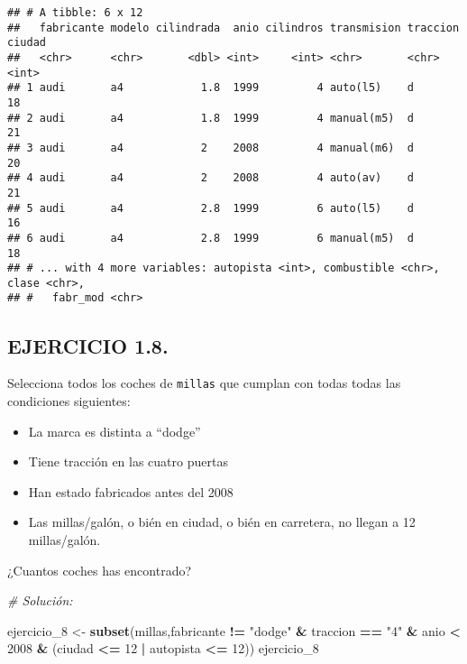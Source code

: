 \documentclass[]{article}
\newenvironment{Shaded}{\begin{snugshade}}{\end{snugshade}}
\newcommand{\CommentTok}[1]{\textcolor[rgb]{0.56,0.35,0.01}{\textit{#1}}}
\newcommand{\DecValTok}[1]{\textcolor[rgb]{0.00,0.00,0.81}{#1}}
\newcommand{\KeywordTok}[1]{\textcolor[rgb]{0.13,0.29,0.53}{\textbf{#1}}}
\newcommand{\NormalTok}[1]{#1}
\newcommand{\OperatorTok}[1]{\textcolor[rgb]{0.81,0.36,0.00}{\textbf{#1}}}
\newcommand{\StringTok}[1]{\textcolor[rgb]{0.31,0.60,0.02}{#1}}
\providecommand{\tightlist}{%
  \setlength{\itemsep}{0pt}\setlength{\parskip}{0pt}}
\begin{document}
\begin{verbatim}
## # A tibble: 6 x 12
##   fabricante modelo cilindrada  anio cilindros transmision traccion ciudad
##   <chr>      <chr>       <dbl> <int>     <int> <chr>       <chr>     <int>
## 1 audi       a4            1.8  1999         4 auto(l5)    d            18
## 2 audi       a4            1.8  1999         4 manual(m5)  d            21
## 3 audi       a4            2    2008         4 manual(m6)  d            20
## 4 audi       a4            2    2008         4 auto(av)    d            21
## 5 audi       a4            2.8  1999         6 auto(l5)    d            16
## 6 audi       a4            2.8  1999         6 manual(m5)  d            18
## # ... with 4 more variables: autopista <int>, combustible <chr>, clase <chr>,
## #   fabr_mod <chr>
\end{verbatim}

\hypertarget{ejercicio-1.8.}{%
\subsection{EJERCICIO 1.8.}\label{ejercicio-1.8.}}

Selecciona todos los coches de \texttt{millas} que cumplan con todas
todas las condiciones siguientes:

\begin{itemize}
\tightlist
\item
  La marca es distinta a ``dodge''
\item
  Tiene tracción en las cuatro puertas
\item
  Han estado fabricados antes del 2008
\item
  Las millas/galón, o bién en ciudad, o bién en carretera, no llegan a
  12 millas/galón.
\end{itemize}

¿Cuantos coches has encontrado?

\begin{Shaded}
\begin{Highlighting}[]
\CommentTok{# Solución:}

\NormalTok{ejercicio_}\DecValTok{8}\NormalTok{ <-}\StringTok{ }\KeywordTok{subset}\NormalTok{(millas,fabricante }\OperatorTok{!=}\StringTok{ "dodge"} \OperatorTok{&}\StringTok{ }\NormalTok{traccion }\OperatorTok{==}\StringTok{ "4"} \OperatorTok{&}\StringTok{ }\NormalTok{anio }\OperatorTok{<}\StringTok{ }\DecValTok{2008} \OperatorTok{&}\StringTok{ }\NormalTok{(ciudad }\OperatorTok{<=}\StringTok{ }\DecValTok{12} \OperatorTok{|}\StringTok{ }\NormalTok{autopista }\OperatorTok{<=}\StringTok{ }\DecValTok{12}\NormalTok{))}
\NormalTok{ejercicio_}\DecValTok{8}
\end{Highlighting}
\end{Shaded}
\end{document}
